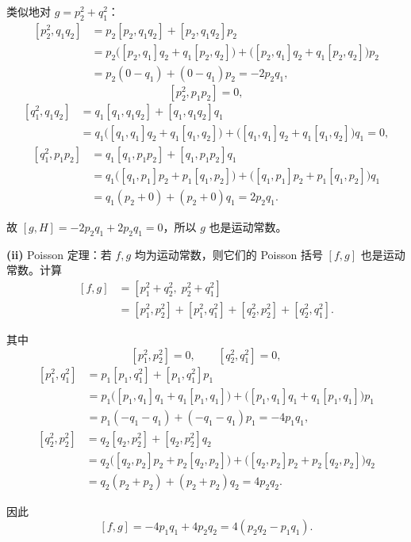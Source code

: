 \begin{question}
\begin{solution}
类似地对 \(g=p_2^2+q_1^2\)：
\[
\begin{aligned}
[p_2^2,q_1q_2] &= p_2[p_2,q_1q_2]+[p_2,q_1q_2]p_2 \\
&= p_2\bigl([p_2,q_1]q_2+q_1[p_2,q_2]\bigr)
+\bigl([p_2,q_1]q_2+q_1[p_2,q_2]\bigr)p_2 \\
&= p_2(0 - q_1)+(0 - q_1)p_2 = -2p_2q_1,
\end{aligned}
\]
\[
[p_2^2,p_1p_2]=0,
\]
\[
\begin{aligned}
[q_1^2,q_1q_2] &= q_1[q_1,q_1q_2]+[q_1,q_1q_2]q_1 \\
&= q_1\bigl([q_1,q_1]q_2+q_1[q_1,q_2]\bigr)
+\bigl([q_1,q_1]q_2+q_1[q_1,q_2]\bigr)q_1 = 0,
\end{aligned}
\]
\[
\begin{aligned}
[q_1^2,p_1p_2] &= q_1[q_1,p_1p_2]+[q_1,p_1p_2]q_1 \\
&= q_1\bigl([q_1,p_1]p_2+p_1[q_1,p_2]\bigr)
+\bigl([q_1,p_1]p_2+p_1[q_1,p_2]\bigr)q_1 \\
&= q_1(p_2+0)+(p_2+0)q_1 = 2p_2q_1.
\end{aligned}
\]

故 \([g,H]=-2p_2q_1+2p_2q_1=0\)，所以 \(g\) 也是运动常数。

\vspace{0.5em}
\textbf{(ii)} Poisson 定理：若 \(f,g\) 均为运动常数，则它们的 Poisson 括号 \([f,g]\) 也是运动常数。计算
\[
\begin{aligned}
[f,g] &= [p_1^2+q_2^2,\;p_2^2+q_1^2] \\
&= [p_1^2,p_2^2] + [p_1^2,q_1^2] + [q_2^2,p_2^2] + [q_2^2,q_1^2].
\end{aligned}
\]

其中
\[
[p_1^2,p_2^2]=0,\qquad [q_2^2,q_1^2]=0,
\]
\[
\begin{aligned}
[p_1^2,q_1^2] &= p_1[p_1,q_1^2]+[p_1,q_1^2]p_1 \\
&= p_1\bigl([p_1,q_1]q_1+q_1[p_1,q_1]\bigr)
+\bigl([p_1,q_1]q_1+q_1[p_1,q_1]\bigr)p_1 \\
&= p_1(-q_1-q_1)+(-q_1-q_1)p_1 = -4p_1q_1,
\end{aligned}
\]
\[
\begin{aligned}
[q_2^2,p_2^2] &= q_2[q_2,p_2^2]+[q_2,p_2^2]q_2 \\
&= q_2\bigl([q_2,p_2]p_2+p_2[q_2,p_2]\bigr)
+\bigl([q_2,p_2]p_2+p_2[q_2,p_2]\bigr)q_2 \\
&= q_2(p_2+p_2)+(p_2+p_2)q_2 = 4p_2q_2.
\end{aligned}
\]

因此
\[
[f,g] = -4p_1q_1+4p_2q_2 = 4(p_2q_2-p_1q_1).
\]


\end{solution}
\end{question}
